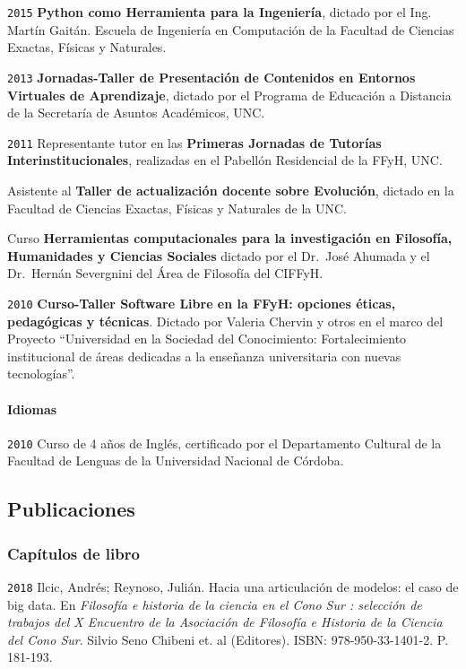 \documentclass[]{article}
\let\oldparagraph\paragraph
\renewcommand{\paragraph}[1]{\oldparagraph{#1}\mbox{}}
\begin{document}
\texttt{2015} \textbf{Python como Herramienta para la Ingeniería},
dictado por el Ing. Martín Gaitán. Escuela de Ingeniería en Computación
de la Facultad de Ciencias Exactas, Físicas y Naturales.

\texttt{2013} \textbf{Jornadas-Taller de Presentación de Contenidos en
Entornos Virtuales de Aprendizaje}, dictado por el Programa de Educación
a Distancia de la Secretaría de Asuntos Académicos, UNC.

\texttt{2011} Representante tutor en las \textbf{Primeras Jornadas de
Tutorías Interinstitucionales}, realizadas en el Pabellón Residencial de
la FFyH, UNC.

Asistente al \textbf{Taller de actualización docente sobre Evolución},
dictado en la Facultad de Ciencias Exactas, Físicas y Naturales de la
UNC.

Curso \textbf{Herramientas computacionales para la investigación en
Filosofía, Humanidades y Ciencias Sociales} dictado por el Dr.~José
Ahumada y el Dr.~Hernán Severgnini del Área de Filosofía del CIFFyH.

\texttt{2010} \textbf{Curso-Taller Software Libre en la FFyH: opciones
éticas, pedagógicas y técnicas}. Dictado por Valeria Chervin y otros en
el marco del Proyecto ``Universidad en la Sociedad del Conocimiento:
Fortalecimiento institucional de áreas dedicadas a la enseñanza
universitaria con nuevas tecnologías''.

\hypertarget{idiomas}{%
\paragraph{Idiomas}\label{idiomas}}

\texttt{2010} Curso de 4 años de Inglés, certificado por el Departamento
Cultural de la Facultad de Lenguas de la Universidad Nacional de
Córdoba.

\hypertarget{publicaciones}{%
\subsection{Publicaciones}\label{publicaciones}}

\hypertarget{capuxedtulos-de-libro}{%
\subsubsection{Capítulos de libro}\label{capuxedtulos-de-libro}}

\texttt{2018} Ilcic, Andrés; Reynoso, Julián. Hacia una articulación de
modelos: el caso de big data. En \emph{Filosofía e historia de la
ciencia en el Cono Sur : selección de trabajos del X Encuentro de la
Asociación de Filosofía e Historia de la Ciencia del Cono Sur}. Silvio
Seno Chibeni et. al (Editores). ISBN: 978-950-33-1401-2. P. 181-193.
\end{document}

